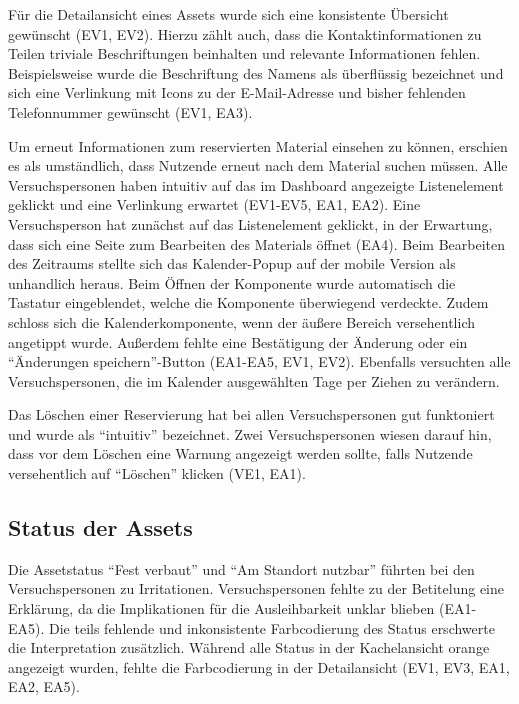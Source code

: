 Für die Detailansicht eines Assets wurde sich eine konsistente Übersicht gewünscht (EV1, EV2).
Hierzu zählt auch, dass die Kontaktinformationen zu Teilen triviale Beschriftungen beinhalten und
relevante Informationen fehlen. Beispielsweise wurde die Beschriftung des Namens als überflüssig
bezeichnet und sich eine Verlinkung mit Icons zu der E-Mail-Adresse und bisher fehlenden
Telefonnummer gewünscht (EV1, EA3).

Um erneut Informationen zum reservierten Material einsehen zu können, erschien es als umständlich,
dass Nutzende erneut nach dem Material suchen müssen. Alle Versuchspersonen haben intuitiv auf das
im Dashboard angezeigte Listenelement geklickt und eine Verlinkung erwartet (EV1-EV5, EA1, EA2).
Eine Versuchsperson hat zunächst auf das Listenelement geklickt, in der Erwartung, dass sich eine
Seite zum Bearbeiten des Materials öffnet (EA4). Beim Bearbeiten des Zeitraums stellte sich das
Kalender-Popup auf der mobile Version als unhandlich heraus. Beim Öffnen der Komponente wurde
automatisch die Tastatur eingeblendet, welche die Komponente überwiegend verdeckte. Zudem schloss
sich die Kalenderkomponente, wenn der äußere Bereich versehentlich angetippt wurde. Außerdem
fehlte eine Bestätigung der Änderung oder ein \enquote{Änderungen speichern}-Button (EA1-EA5, EV1,
EV2). Ebenfalls versuchten alle Versuchspersonen, die im Kalender ausgewählten Tage per Ziehen
zu verändern.

Das Löschen einer Reservierung hat bei allen Versuchspersonen gut funktoniert und wurde als
\enquote{intuitiv} bezeichnet. Zwei Versuchspersonen wiesen darauf hin, dass vor dem Löschen eine
Warnung angezeigt werden sollte, falls Nutzende versehentlich auf \enquote{Löschen} klicken (VE1,
EA1).


\subsection{Status der Assets}
Die Assetstatus \enquote{Fest verbaut} und \enquote{Am Standort nutzbar} führten bei den
Versuchspersonen zu Irritationen. Versuchspersonen fehlte zu der Betitelung eine Erklärung, da die
Implikationen für die Ausleihbarkeit unklar blieben (EA1-EA5). Die teils fehlende und inkonsistente
Farbcodierung des Status erschwerte die Interpretation zusätzlich. Während alle Status in der
Kachelansicht orange angezeigt wurden, fehlte die Farbcodierung in der Detailansicht (EV1, EV3, EA1,
EA2, EA5).

